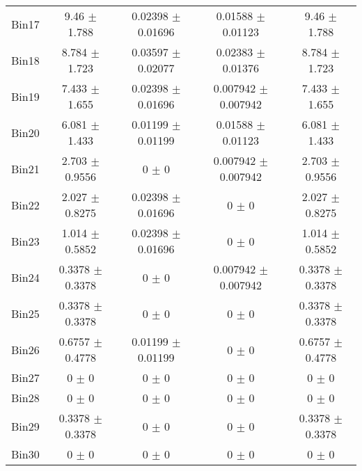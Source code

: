 \begin{tabular}{@{\extracolsep{4pt}}lcccc@{}}
     Bin17 & 9.46 $\pm$ 1.788 & 0.02398 $\pm$ 0.01696 & 0.01588 $\pm$ 0.01123 & 9.46 $\pm$ 1.788 \\ 
     Bin18 & 8.784 $\pm$ 1.723 & 0.03597 $\pm$ 0.02077 & 0.02383 $\pm$ 0.01376 & 8.784 $\pm$ 1.723 \\ 
     Bin19 & 7.433 $\pm$ 1.655 & 0.02398 $\pm$ 0.01696 & 0.007942 $\pm$ 0.007942 & 7.433 $\pm$ 1.655 \\ 
     Bin20 & 6.081 $\pm$ 1.433 & 0.01199 $\pm$ 0.01199 & 0.01588 $\pm$ 0.01123 & 6.081 $\pm$ 1.433 \\ 
     Bin21 & 2.703 $\pm$ 0.9556 & 0 $\pm$ 0 & 0.007942 $\pm$ 0.007942 & 2.703 $\pm$ 0.9556 \\ 
     Bin22 & 2.027 $\pm$ 0.8275 & 0.02398 $\pm$ 0.01696 & 0 $\pm$ 0 & 2.027 $\pm$ 0.8275 \\ 
     Bin23 & 1.014 $\pm$ 0.5852 & 0.02398 $\pm$ 0.01696 & 0 $\pm$ 0 & 1.014 $\pm$ 0.5852 \\ 
     Bin24 & 0.3378 $\pm$ 0.3378 & 0 $\pm$ 0 & 0.007942 $\pm$ 0.007942 & 0.3378 $\pm$ 0.3378 \\ 
     Bin25 & 0.3378 $\pm$ 0.3378 & 0 $\pm$ 0 & 0 $\pm$ 0 & 0.3378 $\pm$ 0.3378 \\ 
     Bin26 & 0.6757 $\pm$ 0.4778 & 0.01199 $\pm$ 0.01199 & 0 $\pm$ 0 & 0.6757 $\pm$ 0.4778 \\ 
     Bin27 & 0 $\pm$ 0 & 0 $\pm$ 0 & 0 $\pm$ 0 & 0 $\pm$ 0 \\ 
     Bin28 & 0 $\pm$ 0 & 0 $\pm$ 0 & 0 $\pm$ 0 & 0 $\pm$ 0 \\ 
     Bin29 & 0.3378 $\pm$ 0.3378 & 0 $\pm$ 0 & 0 $\pm$ 0 & 0.3378 $\pm$ 0.3378 \\ 
     Bin30 & 0 $\pm$ 0 & 0 $\pm$ 0 & 0 $\pm$ 0 & 0 $\pm$ 0 \\ 
\hline\hline
  \end{tabular}
